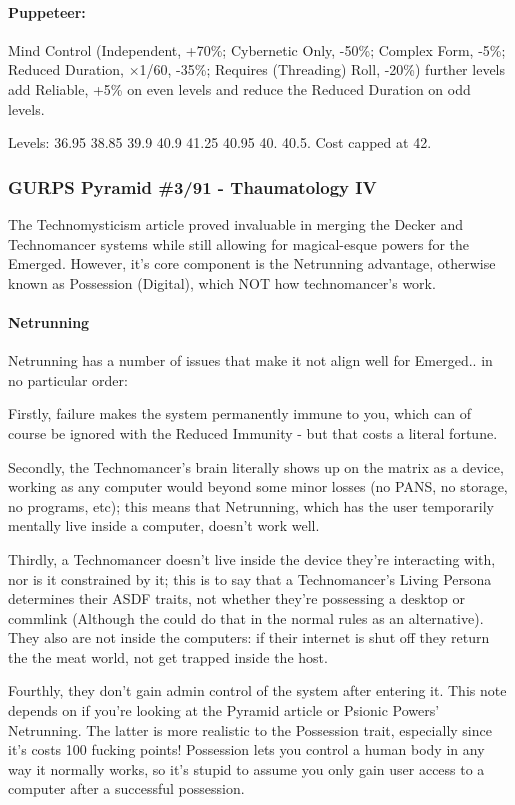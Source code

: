 \begin{multicols*}{2}
	\paragraph{Puppeteer:} Mind Control (Independent, +70\%; Cybernetic Only, -50\%; Complex Form, -5\%; Reduced Duration, \(\times\)1/60, -35\%; Requires (Threading) Roll, -20\%) further levels add Reliable, +5\% on even levels and reduce the Reduced Duration on odd levels.
	
	Levels: 36.95 38.85 39.9 40.9 41.25 40.95 40. 40.5. Cost capped at 42.
	
	
	\subsubsection{GURPS Pyramid \#3/91 - Thaumatology IV}
	
	The Technomysticism article proved invaluable in merging the Decker and Technomancer systems while still allowing for magical-esque powers for the Emerged. However, it's core component is the Netrunning advantage, otherwise known as Possession (Digital), which NOT how technomancer's work.
	
	\paragraph{Netrunning}
	
	Netrunning has a number of issues that make it not align well for Emerged.. in no particular order: 
	
	Firstly, failure makes the system permanently immune to you, which can of course be ignored with the Reduced Immunity - but that costs a literal fortune. 
	
	Secondly, the Technomancer's brain literally shows up on the matrix as a device, working as any computer would beyond some minor losses (no PANS, no storage, no programs, etc); this means that Netrunning, which has the user temporarily mentally live inside a computer, doesn't work well. 
	
	Thirdly, a Technomancer doesn't live inside the device they're interacting with, nor is it constrained by it; this is to say that a Technomancer's Living Persona determines their ASDF traits, not whether they're possessing a desktop or commlink (Although the could do that in the normal rules as an alternative). They also are not inside the computers: if their internet is shut off they return the the meat world, not get trapped inside the host.
	
	Fourthly, they don't gain admin control of the system after entering it. This note depends on if you're looking at the Pyramid article or Psionic Powers' Netrunning. The latter is more realistic to the Possession trait, especially since it's costs 100 fucking points! Possession lets you control a human body in any way it normally works, so it's stupid to assume you only gain user access to a computer after a successful possession.
	

\end{multicols*}
